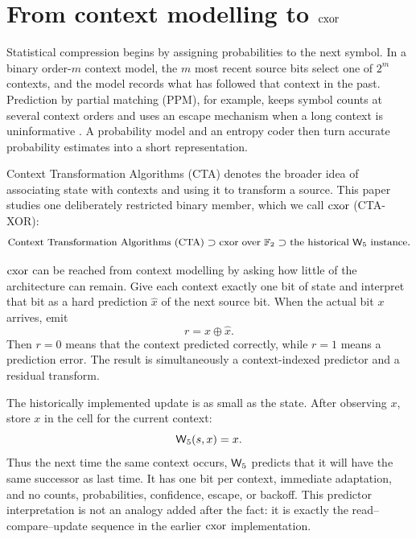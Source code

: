 \section{From context modelling to \texorpdfstring{$\mathrm{cxor}$}{cxor}}\label{sec:intro}

Statistical compression begins by assigning probabilities to the next symbol.  In a binary
order-$m$ context model, the $m$ most recent source bits select one of $2^m$ contexts, and the
model records what has followed that context in the past.  Prediction by partial matching (PPM),
for example, keeps symbol counts at several context orders and uses an escape mechanism when a
long context is uninformative \cite{bell1990text}.  A probability model and an entropy coder then
turn accurate probability estimates into a short representation.

Context Transformation Algorithms (CTA) denotes the broader idea of associating state with
contexts and using it to transform a source.  This paper studies one deliberately restricted
binary member, which we call $\mathrm{cxor}$ (CTA-XOR):
\[
  {\small
    \text{Context Transformation Algorithms (CTA)}
    \supset
    \text{$\mathrm{cxor}$ over $\mathbb{F}_2$}
    \supset
    \text{the historical $\mathsf{W}_{5}$ instance}.}
\]

$\mathrm{cxor}$ can be reached from context modelling by asking how little of the architecture can
remain.  Give each context exactly one bit of state and interpret that bit as a hard prediction
$\hat x$ of the next source bit.  When the actual bit $x$ arrives, emit
\begin{equation}\label{eq:residual-intro}
  r=x\mathbin{\oplus}\hat x .
\end{equation}
Then $r=0$ means that the context predicted correctly, while $r=1$ means a prediction error.  The
result is simultaneously a context-indexed predictor and a residual transform.

The historically implemented update is as small as the state.  After observing $x$, store $x$ in
the cell for the current context:
\begin{equation}\label{eq:w5-intro}
  \mathsf{W}_{5}(s,x)=x .
\end{equation}
Thus the next time the same context occurs, $\mathsf{W}_{5}$ predicts that it will have the same successor as
last time.  It has one bit per context, immediate adaptation, and no counts, probabilities,
confidence, escape, or backoff.  This predictor interpretation is not an analogy added after the
fact: it is exactly the read--compare--update sequence in the earlier $\mathrm{cxor}$ implementation.

